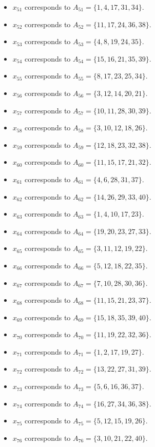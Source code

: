 \documentclass[11pt]{article}
\begin{document}
\begin{itemize}
\item $x_{51}$ corresponds to $A_{51}=\{1, 4, 17, 31, 34\}$.
\item $x_{52}$ corresponds to $A_{52}=\{11, 17, 24, 36, 38\}$.
\item $x_{53}$ corresponds to $A_{53}=\{4, 8, 19, 24, 35\}$.
\item $x_{54}$ corresponds to $A_{54}=\{15, 16, 21, 35, 39\}$.
\item $x_{55}$ corresponds to $A_{55}=\{8, 17, 23, 25, 34\}$.
\item $x_{56}$ corresponds to $A_{56}=\{3, 12, 14, 20, 21\}$.
\item $x_{57}$ corresponds to $A_{57}=\{10, 11, 28, 30, 39\}$.
\item $x_{58}$ corresponds to $A_{58}=\{3, 10, 12, 18, 26\}$.
\item $x_{59}$ corresponds to $A_{59}=\{12, 18, 23, 32, 38\}$.
\item $x_{60}$ corresponds to $A_{60}=\{11, 15, 17, 21, 32\}$.
\item $x_{61}$ corresponds to $A_{61}=\{4, 6, 28, 31, 37\}$.
\item $x_{62}$ corresponds to $A_{62}=\{14, 26, 29, 33, 40\}$.
\item $x_{63}$ corresponds to $A_{63}=\{1, 4, 10, 17, 23\}$.
\item $x_{64}$ corresponds to $A_{64}=\{19, 20, 23, 27, 33\}$.
\item $x_{65}$ corresponds to $A_{65}=\{3, 11, 12, 19, 22\}$.
\item $x_{66}$ corresponds to $A_{66}=\{5, 12, 18, 22, 35\}$.
\item $x_{67}$ corresponds to $A_{67}=\{7, 10, 28, 30, 36\}$.
\item $x_{68}$ corresponds to $A_{68}=\{11, 15, 21, 23, 37\}$.
\item $x_{69}$ corresponds to $A_{69}=\{15, 18, 35, 39, 40\}$.
\item $x_{70}$ corresponds to $A_{70}=\{11, 19, 22, 32, 36\}$.
\item $x_{71}$ corresponds to $A_{71}=\{1, 2, 17, 19, 27\}$.
\item $x_{72}$ corresponds to $A_{72}=\{13, 22, 27, 31, 39\}$.
\item $x_{73}$ corresponds to $A_{73}=\{5, 6, 16, 36, 37\}$.
\item $x_{74}$ corresponds to $A_{74}=\{16, 27, 34, 36, 38\}$.
\item $x_{75}$ corresponds to $A_{75}=\{5, 12, 15, 19, 26\}$.
\item $x_{76}$ corresponds to $A_{76}=\{3, 10, 21, 22, 40\}$.

\end{itemize}
\end{document}

